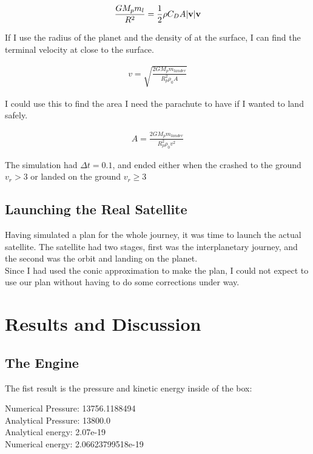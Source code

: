 \documentclass[a4paper, 10pt]{article}
\begin{document}
\begin{align}
\frac{GM_p m_l}{R^2} = \frac{1}{2}\rho C_D A |\bold{v}| \bold{v}
\end{align}

If I use the radius of the planet and the density of at the surface, I can find the terminal velocity at close to the surface.

\begin{align}
v = \sqrt{\frac{2GM_p m_{lander}}{R_p^2 \rho_0 A}}
\end{align}

I could use this to find the area I need the parachute to have if I wanted to land safely. 

\begin{align}
A = \frac{2GM_p m_{lander}}{R_p^2 \rho_0 v^2}
\end{align}

The simulation had $\Delta t = 0.1$, and ended either when the crashed to the ground $v_r > 3$ or landed on the ground $v_r \geq 3$


\subsection{Launching the Real Satellite}
Having simulated a plan for the whole journey, it was time to launch the actual satellite. The satellite had two stages, first was the interplanetary journey, and the second was the orbit and landing on the planet.\\

Since I had used the conic approximation to make the plan, I could not expect to use our plan without having to do some corrections under way. 




\section{Results and Discussion}

\subsection{The Engine}

The fist result is the pressure and kinetic energy inside of the box:
\begin{tcolorbox}
Numerical Pressure:  13756.1188494 \\
Analytical Pressure:  13800.0 \\
Analytical energy:  2.07e-19 \\
Numerical energy:  2.06623799518e-19 
\end{tcolorbox}
\end{document}
